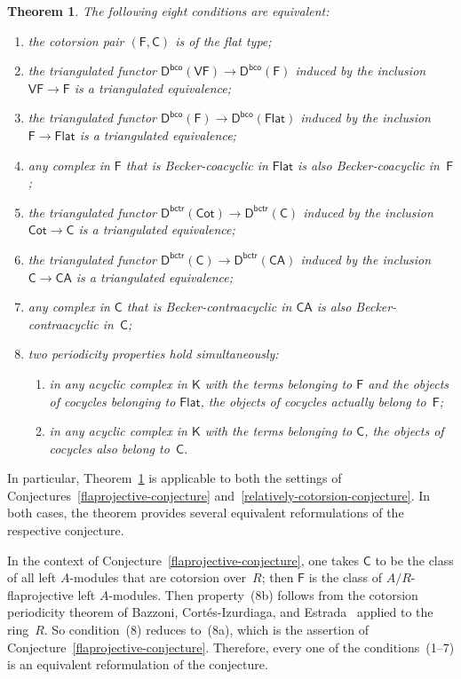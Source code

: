 \documentclass[12pt,a4paper]{amsart}
\newcommand{\+}{\nobreakdash-}
\renewcommand{\:}{\colon}
\newcommand{\rarrow}{\longrightarrow}
\newcommand{\sC}{\mathsf C}
\newcommand{\sD}{\mathsf D}
\newcommand{\sF}{\mathsf F}
\newcommand{\sK}{\mathsf K}
\newcommand{\VF}{\mathsf{VF}}
\newcommand{\CA}{\mathsf{CA}}
\newcommand{\Flat}{\mathsf{Flat}}
\newcommand{\Cot}{\mathsf{Cot}}
\newcommand{\bco}{\mathsf{bco}}
\newcommand{\bctr}{\mathsf{bctr}}
\theoremstyle{plain}
\newtheorem{thm}{Theorem}[section]
\theoremstyle{definition}
\begin{document}
\begin{thm} \label{introd-main-theorem}
 The following eight conditions are equivalent:
\begin{enumerate}
\item the cotorsion pair $(\sF,\sC)$ is of the flat type;
\item the triangulated functor\/ $\sD^\bco(\VF)\rarrow\sD^\bco(\sF)$
induced by the inclusion\/ $\VF\rarrow\sF$ is a triangulated
equivalence;
\item the triangulated functor\/ $\sD^\bco(\sF)\rarrow\sD^\bco(\Flat)$
induced by the inclusion\/ $\sF\rarrow\Flat$ is a triangulated
equivalence;
\item any complex in\/ $\sF$ that is Becker-coacyclic in\/ $\Flat$ is
also Becker-coacyclic in\/~$\sF$;
\item the triangulated functor\/ $\sD^\bctr(\Cot)\rarrow\sD^\bctr(\sC)$
induced by the inclusion\/ $\Cot\rarrow\sC$ is a triangulated
equivalence;
\item the triangulated functor\/ $\sD^\bctr(\sC)\rarrow\sD^\bctr(\CA)$
induced by the inclusion\/ $\sC\rarrow\CA$ is a triangulated
equivalence;
\item any complex in\/ $\sC$ that is Becker-contraacyclic in\/ $\CA$ is
also Becker-con\-tra\-acyclic in\/~$\sC$;
\item two periodicity properties hold simultaneously:
\begin{enumerate}
\renewcommand{\theenumii}{\alph{enumii}}
\item in any acyclic complex in\/ $\sK$ with the terms belonging to\/
$\sF$ and the objects of cocycles belonging to\/ $\Flat$, the objects
of cocycles actually belong to\/~$\sF$;
\item in any acyclic complex in\/ $\sK$ with the terms belonging to\/
$\sC$, the objects of cocycles also belong to\/~$\sC$.
\end{enumerate}
\end{enumerate}
\end{thm}

 In particular, Theorem~\ref{introd-main-theorem} is applicable to
both the settings of Conjectures~\ref{flaprojective-conjecture}
and~\ref{relatively-cotorsion-conjecture}.
 In both cases, the theorem provides several equivalent reformulations
of the respective conjecture.

 In the context of Conjecture~\ref{flaprojective-conjecture}, one
takes $\sC$ to be the class of all left $A$\+modules that are
cotorsion over~$R$; then $\sF$ is the class of $A/R$\+flaprojective
left $A$\+modules.
 Then property~(8b) follows from the cotorsion periodicity theorem of
Bazzoni, Cort\'es-Izurdiaga, and Estrada~\cite{BCE} applied to
the ring~$R$.
 So condition~(8) reduces to~(8a), which is the assertion of
Conjecture~\ref{flaprojective-conjecture}.
 Therefore, every one of the conditions~(1\+-7) is an equivalent 
reformulation of the conjecture.
\end{document}
